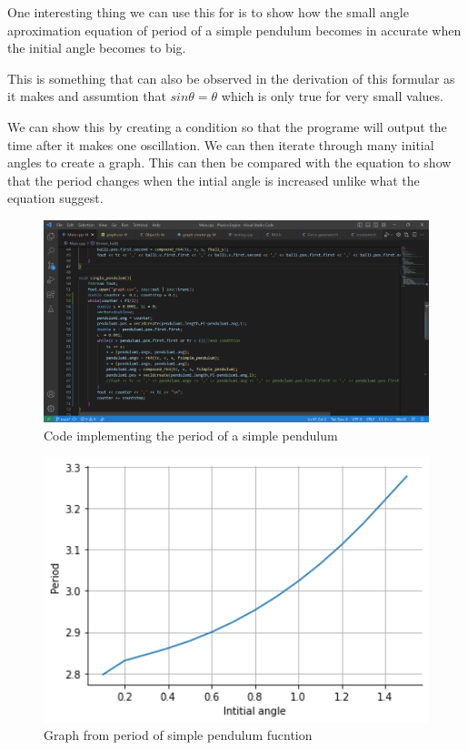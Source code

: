 \documentclass[12pt, a2paper]{article}
\begin{document}
One interesting thing we can use this for is to show how the small angle aproximation equation of period of a simple pendulum becomes in accurate when the initial angle becomes to big. 

This is something that can also be observed in the derivation of this formular as it makes and assumtion that \(sin\theta = \theta\) which is only true for very small values.

We can show this by creating a condition so that the programe will output the time after it makes one oscillation. We can then iterate through many initial angles to create a graph. This can then be compared with the equation to show that the period changes when the intial angle is increased unlike what the equation suggest.
\begin{figure}[h]
\center
\includegraphics[width=1\textwidth]{Period of pendulum function}
\caption{Code implementing the period of a simple pendulum}
\label{fig 5}
\end{figure}
\begin{figure}[h]
\center
\includegraphics[width=1\textwidth]{Period of pendulum graph}
\caption{Graph from period of simple pendulum fucntion}
\label{Graph 4}
\end{figure}
\end{document}
